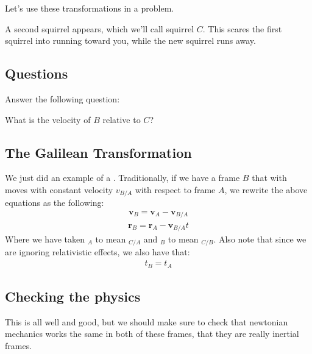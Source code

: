 \documentclass[letterpaper,10pt,english]{jupyterBook}
\begin{document}
\sphinxAtStartPar
Let’s use these transformations in a problem.

\sphinxAtStartPar
A second squirrel appears, which we’ll call squirrel \(C\). This scares the first squirrel into running toward you, while the new squirrel runs away.




\subsection{Questions}
\label{\detokenize{content/1_mechanics/frames:id1}}
\sphinxAtStartPar
{}

\sphinxAtStartPar
Answer the following question:

\sphinxAtStartPar
What is the velocity of \(B\) relative to \(C\)?


\subsection{The Galilean Transformation}
\label{\detokenize{content/1_mechanics/frames:the-galilean-transformation}}
\sphinxAtStartPar
We just did an example of a . Traditionally, if we have a frame \(B\) that with moves with constant velocity \(v_{B/A}\) with respect to frame \(A\), we re\sphinxhyphen{}write the above equations as the following:
\begin{equation*}
\begin{split}\mathbf{v}_B = \mathbf{v}_A - \textbf{v}_{B/A}\end{split}
\end{equation*}\begin{equation*}
\begin{split}\mathbf{r}_B = \mathbf{r}_A - \mathbf{v}_{B/A} t\end{split}
\end{equation*}
\sphinxAtStartPar
Where we have taken \(_A\) to mean \(_{C/A}\) and \(_B\) to mean \(_{C/B}\). Also note that since we are ignoring relativistic effects, we also have that:
\begin{equation*}
\begin{split}t_B = t_A\end{split}
\end{equation*}

\subsection{Checking the physics}
\label{\detokenize{content/1_mechanics/frames:checking-the-physics}}
\sphinxAtStartPar
This is all well and good, but we should make sure to check that newtonian mechanics works the same in both of these frames, that they are really inertial frames.
\end{document}
